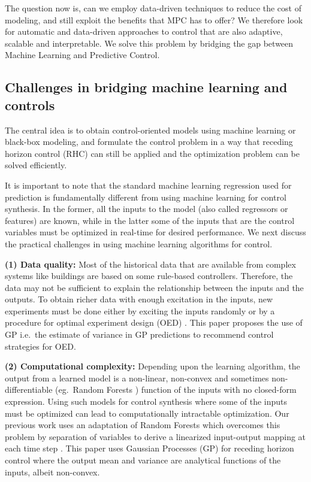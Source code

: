 The question now is, can we employ data-driven techniques to reduce the cost of modeling, and still exploit the benefits that MPC has to offer? We therefore look for automatic and data-driven approaches to control that are also adaptive, scalable and interpretable. We solve this problem by bridging the gap between Machine Learning and Predictive Control.

\subsection{Challenges in bridging machine learning and controls}
\label{SS:practical_challenges}

The central idea is to obtain control-oriented models using machine learning or black-box modeling, and formulate the control problem in a way that receding horizon control (RHC) can still be applied and the optimization problem can be solved efficiently.

It is important to note that the standard machine learning regression used for prediction is fundamentally different from using machine learning for control synthesis. In the former, all the inputs to the model (also called regressors or features) are known, while in the latter some of the inputs that are the control variables must be optimized in real-time for desired performance. 
We next discuss the practical challenges in using machine learning algorithms for control.

\noindent \textbf{(1) Data quality:} Most of the historical data that are available from complex systems like buildings are based on some rule-based controllers. Therefore, the data may not be sufficient to explain the relationship between the inputs and the outputs. To obtain richer data with enough excitation in the inputs, new experiments must be done either by exciting the inputs randomly or by a procedure for optimal experiment design (OED) \cite{Emery1998,Fedorov2010}. This paper proposes the use of GP i.e.~the estimate of variance in GP predictions to recommend control strategies for OED.

\noindent \textbf{(2) Computational complexity:} Depending upon the learning algorithm, the output from a learned model is a non-linear, non-convex and sometimes non-differentiable (eg.~Random Forests \cite{Friedman2001}) function of the inputs with no closed-form expression. Using such models for control synthesis where some of the inputs must be optimized can lead to computationally intractable optimization. Our previous work uses an adaptation of Random Forests which overcomes this problem by separation of variables to derive a linearized input-output mapping at each time step \cite{JainACC2017,JainCDC2017}.
This paper uses Gaussian Processes (GP) for receding horizon control where the output mean and variance are analytical functions of the inputs, albeit non-convex.

